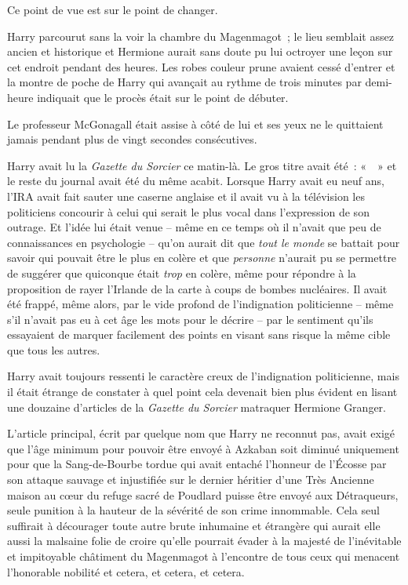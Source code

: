 Ce point de vue est sur le point de changer.

\later

Harry parcourut sans la voir la chambre du Magenmagot~; le lieu semblait assez ancien et historique et Hermione aurait sans doute pu lui octroyer une leçon sur cet endroit pendant des heures. Les robes couleur prune avaient cessé d'entrer et la montre de poche de Harry qui avançait au rythme de trois minutes par demi-heure indiquait que le procès était sur le point de débuter.

Le professeur McGonagall était assise à côté de lui et ses yeux ne le quittaient jamais pendant plus de vingt secondes consécutives.

Harry avait lu la \emph{Gazette du Sorcier} ce matin-là. Le gros titre avait été~: «~~» et le reste du journal avait été du même acabit. Lorsque Harry avait eu neuf ans, l'IRA avait fait sauter une caserne anglaise et il avait vu à la télévision les politiciens concourir à celui qui serait le plus vocal dans l'expression de son outrage. Et l'idée lui était venue -- même en ce temps où il n'avait que peu de connaissances en psychologie -- qu'on aurait dit que \emph{tout le monde} se battait pour savoir qui pouvait être le plus en colère et que \emph{personne} n'aurait pu se permettre de suggérer que quiconque était \emph{trop} en colère, même pour répondre à la proposition de rayer l'Irlande de la carte à coups de bombes nucléaires. Il avait été frappé, même alors, par le vide profond de l'indignation politicienne -- même s'il n'avait pas eu à cet âge les mots pour le décrire -- par le sentiment qu'ils essayaient de marquer facilement des points en visant sans risque la même cible que tous les autres.

Harry avait toujours ressenti le caractère creux de l'indignation politicienne, mais il était étrange de constater à quel point cela devenait bien plus évident en lisant une douzaine d'articles de la \emph{Gazette du Sorcier} matraquer Hermione Granger.

L'article principal, écrit par quelque nom que Harry ne reconnut pas, avait exigé que l'âge minimum pour pouvoir être envoyé à Azkaban soit diminué uniquement pour que la Sang-de-Bourbe tordue qui avait entaché l'honneur de l'Écosse par son attaque sauvage et injustifiée sur le dernier héritier d'une Très Ancienne maison au cœur du refuge sacré de Poudlard puisse être envoyé aux Détraqueurs, seule punition à la hauteur de la sévérité de son crime innommable. Cela seul suffirait à décourager toute autre brute inhumaine et étrangère qui aurait elle aussi la malsaine folie de croire qu'elle pourrait évader à la majesté de l'inévitable et impitoyable châtiment du Magenmagot à l'encontre de tous ceux qui menacent l'honorable nobilité et cetera, et cetera, et cetera. 

